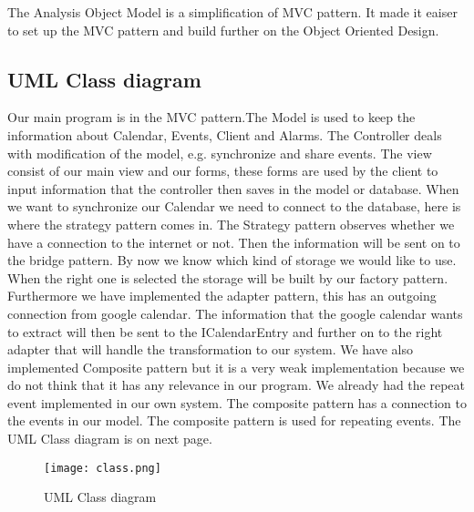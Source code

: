 The Analysis Object Model is a simplification of MVC pattern. It made it eaiser to set up the MVC pattern and build further on the Object Oriented Design. 

\subsection{UML Class diagram}
Our main program is in the MVC pattern.The Model is used to keep the information about Calendar, Events, Client and Alarms. The Controller deals with modification of the model, e.g. synchronize and share events. The view consist of our main view and our forms, these forms are used by the client to input information that the controller then saves in the model or database.
When we want to synchronize our Calendar we need to connect to the database, here is where the strategy pattern comes in. The Strategy pattern observes whether we have a connection to the internet or not. Then the information will be sent on to the bridge pattern. By now we know which kind of storage we would like to use. When the right one is selected the storage will be built by our factory pattern. 
Furthermore we have implemented the adapter pattern, this has an outgoing connection from google calendar. The information that the google calendar wants to extract will then be sent to the ICalendarEntry and further on to the right adapter that will handle the transformation to our system. 
We have also implemented Composite pattern but it is a very weak implementation because we do not think that it has any relevance in our program. We already had the repeat event implemented in our own system. The composite pattern has a connection to the events in our model. The composite pattern is used for repeating events.
\newline
The UML Class diagram is on next page.

\begin{sidewaysfigure}[ht!]
\centering
\texttt{[image: class.png]}
\caption{UML Class diagram \label{overflow}}
\label{figur:class}
\end{sidewaysfigure}
